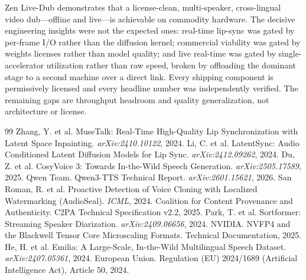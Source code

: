 \documentclass[11pt,a4paper]{article}
\begin{document}
Zen Live-Dub demonstrates that a license-clean, multi-speaker, cross-lingual video dub---offline and live---is achievable on commodity hardware. The decisive engineering insights were not the expected ones: real-time lip-sync was gated by per-frame I/O rather than the diffusion kernel; commercial viability was gated by weights licenses rather than model quality; and live real-time was gated by single-accelerator utilization rather than raw speed, broken by offloading the dominant stage to a second machine over a direct link. Every shipping component is permissively licensed and every headline number was independently verified. The remaining gaps are throughput headroom and quality generalization, not architecture or license.

\begin{thebibliography}{99}
 Zhang, Y. et al. MuseTalk: Real-Time High-Quality Lip Synchronization with Latent Space Inpainting. \textit{arXiv:2410.10122}, 2024.
 Li, C. et al. LatentSync: Audio Conditioned Latent Diffusion Models for Lip Sync. \textit{arXiv:2412.09262}, 2024.
 Du, Z. et al. CosyVoice 3: Towards In-the-Wild Speech Generation. \textit{arXiv:2505.17589}, 2025.
 Qwen Team. Qwen3-TTS Technical Report. \textit{arXiv:2601.15621}, 2026.
 San Roman, R. et al. Proactive Detection of Voice Cloning with Localized Watermarking (AudioSeal). \textit{ICML}, 2024.
 Coalition for Content Provenance and Authenticity. C2PA Technical Specification v2.2, 2025.
 Park, T. et al. Sortformer: Streaming Speaker Diarization. \textit{arXiv:2409.06656}, 2024.
 NVIDIA. NVFP4 and the Blackwell Tensor Core Microscaling Formats. Technical Documentation, 2025.
 He, H. et al. Emilia: A Large-Scale, In-the-Wild Multilingual Speech Dataset. \textit{arXiv:2407.05361}, 2024.
 European Union. Regulation (EU) 2024/1689 (Artificial Intelligence Act), Article 50, 2024.
\end{thebibliography}
\end{document}
